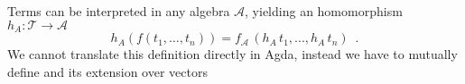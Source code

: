\begin{code}
\>[2]\AgdaSpace{}%
\AgdaSymbol{:}\AgdaSpace{}%
\AgdaSpace{}%
\<%
\\
%
\>[2]\AgdaSpace{}%
\AgdaSymbol{=}\AgdaSpace{}%
%
\>[16]\AgdaSymbol{\{}\AgdaSpace{}%
\AgdaSpace{}%
\AgdaSymbol{=}\AgdaSpace{}%
\AgdaSpace{}%
\AgdaSpace{}%
\<%
\\
%
\>[16]\AgdaSymbol{;}\AgdaSpace{}%
\AgdaSpace{}%
\AgdaSymbol{=}\AgdaSpace{}%
\AgdaSpace{}%
\AgdaSpace{}%
\AgdaSpace{}%
\AgdaSpace{}%
\AgdaSymbol{\{}\AgdaSpace{}%
\AgdaSpace{}%
\AgdaSymbol{=}\AgdaSpace{}%
\AgdaSpace{}%
\AgdaSpace{}%
\AgdaSymbol{;}\AgdaSpace{}%
\AgdaSpace{}%
\AgdaSymbol{=}\AgdaSpace{}%
\AgdaSpace{}%
\AgdaSymbol{(}\AgdaSpace{}%
\AgdaSymbol{)}\AgdaSpace{}%
\AgdaSpace{}%
\AgdaSpace{}%
\AgdaSymbol{\}}\<%
\\
%
\>[16]\AgdaSymbol{\}}\<%
\\
%
\end{code}

\noindent Terms can be interpreted in any algebra
$\mathcal{A}$, yielding an homomorphism $h_A \colon \mathcal{T}
\to \mathcal{A}$
\[
  h_A (f(t_1,\ldots,t_n)) = f_{\mathcal{A}}\,(h_A\,t_1,...,h_A\,t_n) \enspace .
\] 
\noindent We cannot translate this definition directly in Agda, instead
we have to mutually define  and its extension over vectors

